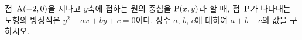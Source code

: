 점~$\mathrm{A}(-2{,}\mkern3mu\mathopen{}0)$을 지나고 $y$축에 접하는 원의 중심을 $\mathrm{P}(x{,}\mkern3mu\mathopen{}y)$라 할 때, 점~$\mathrm{P}$가 나타내는 도형의 방정식은 $y^2+ax+by+c=0$이다. 상수 $a$, $b$, $c$에 대하여 $a+b+c$의 값을 구하시오.

